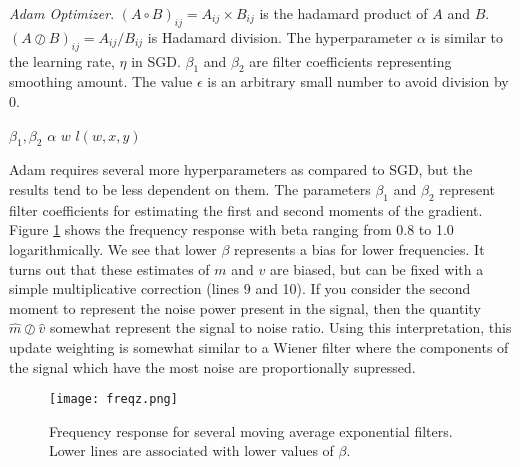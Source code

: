 \begin{algorithm}
\begin{algorithmic}[1]
\begin{spacing}{1.0}
    \caption{\textit{Adam Optimizer}.  $(A\circ B)_{ij} = A_{ij}\times B_{ij}$ is the hadamard product of $A$ and $B$.  $(A \oslash B)_{ij} = A_{ij}/B_{ij}$ is Hadamard division.  The hyperparameter $\alpha$ is similar to the learning rate, $\eta$ in SGD.  $\beta_1$ and $\beta_2$ are filter coefficients representing smoothing amount.  The value $\epsilon$ is an arbitrary small number to avoid division by $0$.}
    \Require $\beta_1,\beta_2$
    \Require $\alpha$
    \Require $w$
    \Require $l(w,x,y)$
    \EndWhile
\label{alg:adam}
\end{spacing}
\end{algorithmic}
\end{algorithm}

Adam requires several more hyperparameters as compared to SGD, but the results tend to be less dependent on them.  The parameters $\beta_1$ and $\beta_2$ represent filter coefficients for estimating the first and second moments of the gradient.  Figure \ref{fig:freqz} shows the frequency response with beta ranging from 0.8 to 1.0 logarithmically.  We see that lower $\beta$ represents a bias for lower frequencies.  It turns out that these estimates of $m$ and $v$ are biased, but can be fixed with a simple multiplicative correction (lines 9 and 10).  If you consider the second moment to represent the noise power present in the signal, then the quantity $\hat{m}\oslash \hat{v}$ somewhat represent the signal to noise ratio.  Using this interpretation, this update weighting is somewhat similar to a Wiener filter where the components of the signal which have the most noise are proportionally supressed.

\begin{figure}
    \centering
    \texttt{[image: freqz.png]}
    \caption{Frequency response for several moving average exponential filters.  Lower lines are associated with lower values of $\beta$.}
    \label{fig:freqz}
\end{figure}

